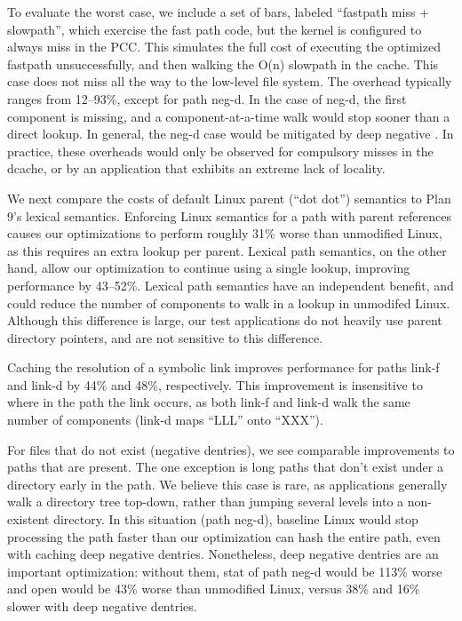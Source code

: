 To evaluate the worst case, we include a set of bars, labeled ``fastpath miss + slowpath'', 
which exercise the fast path code, but the kernel is configured to always
miss in the PCC.  This simulates the full cost of executing the optimized fastpath unsuccessfully,
and then walking the O(n) slowpath in the cache.  This case 
does not miss all the way to the low-level file system.
The overhead typically ranges from 12--93\%,
except for path neg-d.
In the case of neg-d, the first component is missing, and a component-at-a-time walk
would stop sooner than a direct lookup. 
In general, the neg-d case would be mitigated by deep negative \dentries{}.
In practice, these overheads would only be observed 
for compulsory misses in the dcache, or by an application that exhibits
an extreme lack of locality.  

We next compare the costs of default Linux parent (``dot dot'') semantics 
to Plan 9's lexical semantics.  Enforcing 
Linux semantics for a path with parent references causes our optimizations
to perform roughly 31\% worse than unmodified Linux, as this requires an extra lookup 
per parent.
Lexical path semantics, on the other hand, allow our optimization to continue using a single
lookup, improving performance by 43--52\%.  Lexical path semantics
have an independent benefit, and could reduce the number of components
to walk in a lookup in unmodifed Linux.  
Although this difference is large, our test applications do not heavily use 
parent directory pointers, and are not sensitive to this difference.

Caching the resolution of a symbolic link improves 
performance for paths link-f and link-d by 44\% and 48\%, respectively.
This improvement is insensitive to where in the path the link occurs, 
as both link-f and link-d walk the same number of components (link-d maps ``LLL'' onto ``XXX'').

For files that do not exist (negative dentries), 
we see comparable improvements to paths that are present.  The one exception is
long paths that don't exist under a directory early in the path.
We believe this case is rare, as applications generally walk a directory tree top-down, rather than jumping
several levels into a non-existent directory.
In this situation (path neg-d), baseline Linux would stop processing the path faster
than our optimization can hash the entire path, even with caching deep negative dentries.
Nonetheless, deep negative dentries are an important optimization:
without them, stat of path neg-d would be 113\% worse 
and open would be 43\% worse than unmodified Linux, versus 38\% and 16\% slower with
deep negative dentries.

